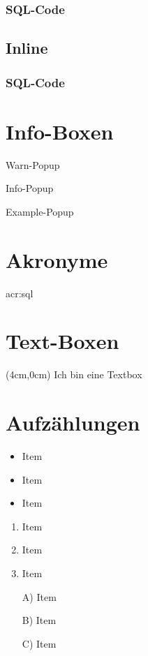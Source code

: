 \subsubsection{SQL-Code}

\subsection{Inline}
\subsubsection{SQL-Code}

\section{Info-Boxen}
\begin{warn-popup}
  Warn-Popup
\end{warn-popup}

\begin{info-popup}
  Info-Popup
\end{info-popup}

\begin{example-popup}
  Example-Popup
\end{example-popup}


\section{Akronyme}
\acrfull{acr:sql}

\section{Text-Boxen}
\begin{textblock*}{\textwidth}(4cm,0cm)
  Ich bin eine Textbox
\end{textblock*}

\section{Aufzählungen}
\begin{itemize}[itemsep=0pt]
  \item Item
  \item Item
  \item Item
\end{itemize}

\begin{enumerate}[itemsep=0pt]
  \item Item
  \item Item
  \item Item
\end{enumerate}

\begin{itemize}[itemsep=0pt]
  \item[A)] Item
  \item[B)] Item
  \item[C)] Item
\end{itemize}
